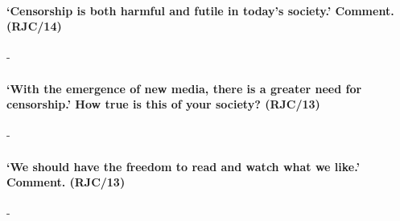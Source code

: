 \documentclass[../../main]{subfiles}
\begin{document}
\paragraph{`Censorship is both harmful and futile in today's society.' Comment. (RJC/14)}-

\paragraph{`With the emergence of new media, there is a greater need for censorship.' How true is this of your society? (RJC/13)}-

\paragraph{`We should have the freedom to read and watch what we like.' Comment. (RJC/13)}-	
\end{document}
